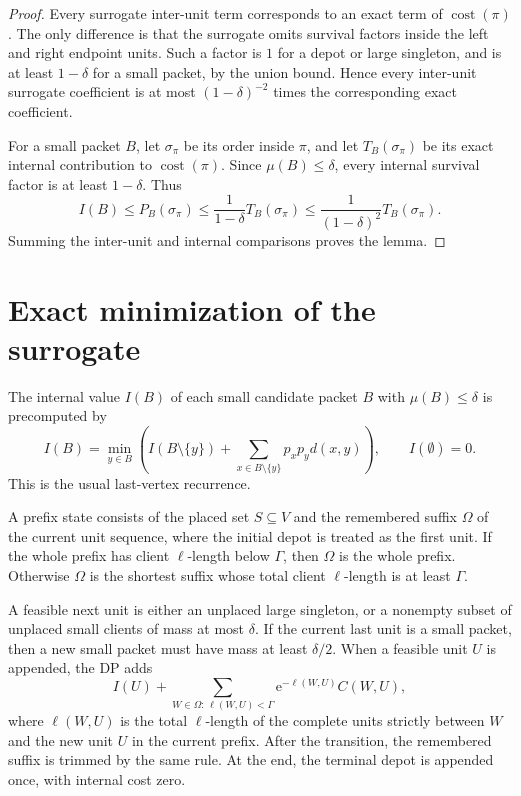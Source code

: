 \documentclass[11pt]{article}
\newcommand{\cost}{\operatorname{cost}}
\newcommand{\e}{\mathrm e}
\begin{document}
\begin{proof}
Every surrogate inter-unit term corresponds to an exact term of $\cost(\pi)$.
The only difference is that the surrogate omits survival factors inside the left
and right endpoint units.  Such a factor is $1$ for a depot or large singleton,
and is at least $1-\delta$ for a small packet, by the union bound.  Hence every
inter-unit surrogate coefficient is at most $(1-\delta)^{-2}$ times the
corresponding exact coefficient.

For a small packet $B$, let $\sigma_\pi$ be its order inside $\pi$, and let
$T_B(\sigma_\pi)$ be its exact internal contribution to $\cost(\pi)$.  Since
$\mu(B)\le\delta$, every internal survival factor is at least $1-\delta$.  Thus
\[
    I(B)
    \le P_B(\sigma_\pi)
    \le \frac{1}{1-\delta}T_B(\sigma_\pi)
    \le \frac{1}{(1-\delta)^2}T_B(\sigma_\pi).
\]
Summing the inter-unit and internal comparisons proves the lemma.
\end{proof}

\section{Exact minimization of the surrogate}

The internal value $I(B)$ of each small candidate packet $B$ with
$\mu(B)\le\delta$ is precomputed by
\[
    I(B)=\min_{y\in B}\left(I(B\setminus\{y\})+
    \sum_{x\in B\setminus\{y\}}p_xp_y d(x,y)\right),
    \qquad I(\emptyset)=0.
\]
This is the usual last-vertex recurrence.

A prefix state consists of the placed set $S\subseteq V$ and the remembered
suffix $\Omega$ of the current unit sequence, where the initial depot is treated
as the first unit.  If the whole prefix has client $\ell$-length below $\Gamma$,
then $\Omega$ is the whole prefix.  Otherwise $\Omega$ is the shortest suffix
whose total client $\ell$-length is at least $\Gamma$.

A feasible next unit is either an unplaced large singleton, or a nonempty subset
of unplaced small clients of mass at most $\delta$.  If the current last unit is
a small packet, then a new small packet must have mass at least $\delta/2$.  When
a feasible unit $U$ is appended, the DP adds
\[
    I(U)+
    \sum_{W\in\Omega:\,\ell(W,U)<\Gamma}
    \e^{-\ell(W,U)}C(W,U),
\]
where $\ell(W,U)$ is the total $\ell$-length of the complete units strictly
between $W$ and the new unit $U$ in the current prefix.  After the transition,
the remembered suffix is trimmed by the same rule.  At the end, the terminal
depot is appended once, with internal cost zero.
\end{document}
